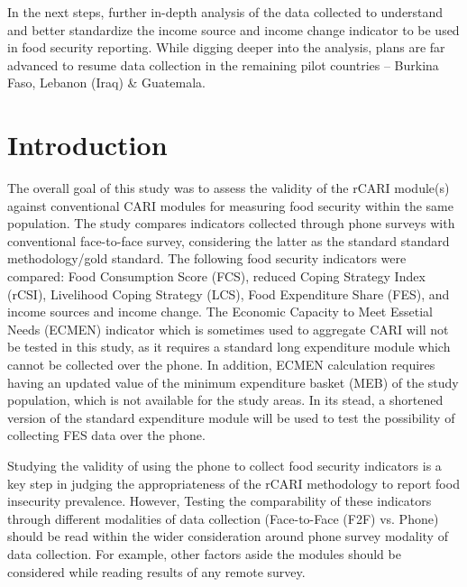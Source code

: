 \documentclass[11pt,harvard]{article}
\begin{document}
In the next steps, further in-depth analysis of the data collected to understand and better standardize the income source and income change indicator to be used in food security reporting. While digging deeper into the analysis, plans are far advanced to resume data collection in the remaining pilot countries – Burkina Faso, Lebanon (Iraq) \& Guatemala.


 


\pagebreak
	
\section{Introduction}

The overall goal of this study was to assess the validity of the rCARI module(s) against conventional CARI modules for measuring food security within the same population. The study compares indicators collected through phone surveys with conventional face-to-face survey, considering the latter as the standard standard methodology/gold standard. The following food security indicators were compared: Food Consumption Score (FCS), reduced Coping Strategy Index (rCSI), Livelihood Coping Strategy (LCS), Food Expenditure Share (FES), and income sources and income change. The Economic Capacity to Meet Essetial Needs (ECMEN) indicator which is sometimes used to aggregate CARI will not be tested in this study, as it requires a standard long expenditure module which cannot be collected over the phone. In addition, ECMEN calculation requires having an updated value of the minimum expenditure basket (MEB) of the study population, which is not available for the study areas. In its stead, a shortened version of the standard expenditure module will be used to test the possibility of collecting FES data over the phone.

Studying the validity of using the phone to collect food security indicators is a key step in judging the appropriateness of the rCARI methodology to report food insecurity prevalence. However, Testing the comparability of these indicators through different modalities of data collection (Face-to-Face (F2F) vs. Phone) should be read within the wider consideration around phone survey modality of data collection. For example, other factors aside the modules should be considered while reading results of any remote survey.
\end{document}
